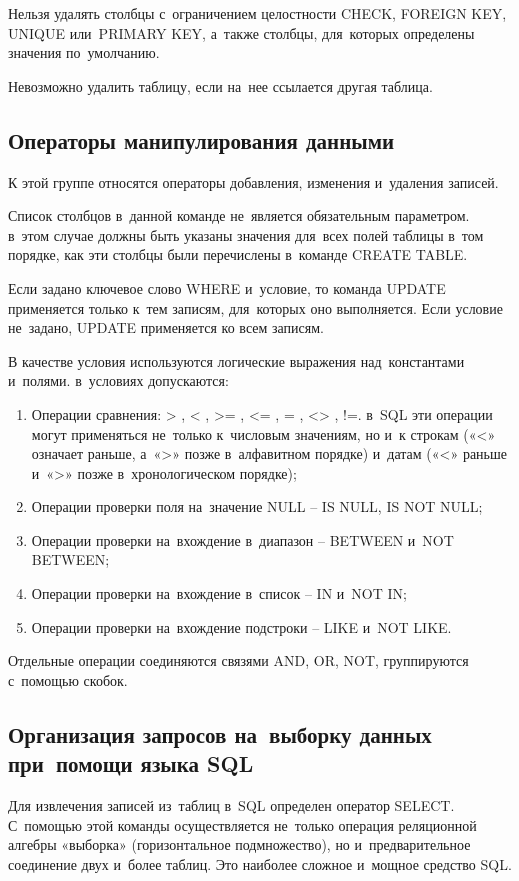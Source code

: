 \documentclass{ou}
\begin{document}
Нельзя удалять столбцы с~ограничением целостности CHECK, FOREIGN KEY, UNIQUE или~PRIMARY KEY, а~также столбцы, для~которых определены значения по~умолчанию. 
 
Невозможно удалить таблицу, если на~нее ссылается другая таблица. 
\subsection{Операторы манипулирования данными}
К этой группе относятся операторы добавления, изменения и~удаления записей. 

Список столбцов в~данной команде не~является обязательным параметром. в~этом случае должны быть указаны значения для~всех полей таблицы в~том порядке, как эти столбцы были перечислены в~команде CREATE TABLE. 

Если задано ключевое слово WHERE и~условие, то команда UPDATE применяется только к~тем записям, для~которых оно выполняется. Если условие не~задано, UPDATE применяется ко всем записям. 

В качестве условия используются логические выражения над~константами и~полями. в~условиях допускаются: 
\begin{enumerate}[itemindent=4em, nosep, label=\arabic*)]
\item Операции сравнения: > , < , >= , <= , = , <> , !=. в~SQL эти операции могут применяться не~только к~числовым значениям, но и~к строкам («<» означает раньше, а~«>» позже в~алфавитном порядке) и~датам («<» раньше и~«>» позже в~хронологическом порядке);
\item Операции проверки поля на~значение NULL -- IS NULL, IS NOT NULL;
\item Операции проверки на~вхождение в~диапазон -- BETWEEN и~NOT BETWEEN;
\item Операции проверки на~вхождение в~список -- IN и~NOT IN;
\item Операции проверки на~вхождение подстроки -- LIKE и~NOT LIKE.
\end{enumerate}

Отдельные операции соединяются связями AND, OR, NOT, группируются с~помощью скобок. 

\subsection{Организация запросов на~выборку данных при~помощи языка SQL} 
Для извлечения записей из~таблиц в~SQL определен оператор SELECT. С~помощью этой команды осуществляется не~только операция реляционной алгебры «выборка» (горизонтальное подмножество), но и~предварительное соединение двух и~более таблиц. Это наиболее сложное и~мощное средство SQL.
\end{document}
